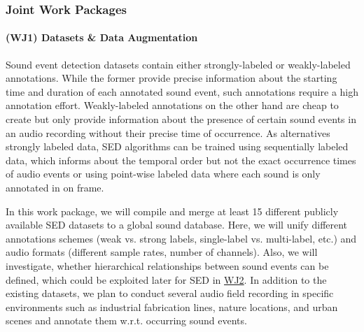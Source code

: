 \documentclass[11pt]{article}
\newcommand{\wpdef}[2]{\hypertarget{sec:W#1}{\paragraph*{(W#1) #2}\label{sec:W#1}}}
\newcommand{\wpref}[2]{\hyperlink{sec:W#1}{#2}}
\begin{document}
\subsubsection{Joint Work Packages}
\label{sec:wj}

\wpdef{J1}{Datasets \& Data Augmentation}\label{WJ1}
Sound event detection datasets contain either strongly-labeled or weakly-labeled annotations. While the former provide precise information about the starting time and duration of each annotated sound event, such annotations require a high annotation effort. Weakly-labeled annotations on the other hand are cheap to create but only provide information about the presence of certain sound events in an audio recording without their precise time of occurrence. 
As alternatives strongly labeled data, SED algorithms can be trained using sequentially labeled data, which informs about the temporal order but not the exact occurrence times of audio events \cite{Hou:2019:SoundEvent:ICASSP} or using point-wise labeled data \cite{Kim:2019:PointWise:WASPAA} where each sound is only annotated in on frame.

In this work package, we will compile and merge at least 15 different publicly available SED datasets to a global sound database. 
Here, we will unify different annotations schemes (weak vs. strong labels, single-label vs. multi-label, etc.) and audio formats (different sample rates, number of channels).
Also, we will investigate, whether hierarchical relationships between sound events can be defined, which could be exploited later for SED in  \wpref{J2}{WJ2}.
In addition to the existing datasets, we plan to conduct several audio field recording in specific environments such as industrial fabrication lines, nature locations, and urban scenes and annotate them w.r.t. occurring sound events.
\end{document}
